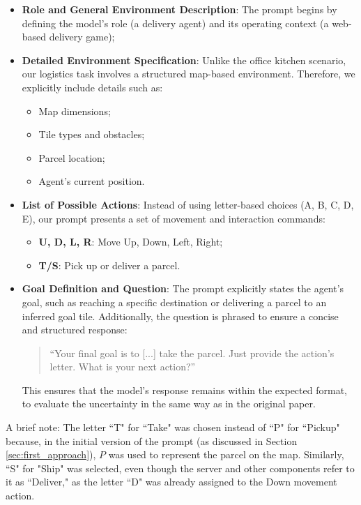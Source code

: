\begin{itemize}
  \item \textbf{Role and General Environment Description}: The prompt begins by defining
    the model's role (a delivery agent) and its operating context (a web-based
    delivery game);

  \item \textbf{Detailed Environment Specification}: Unlike the office kitchen scenario,
    our logistics task involves a structured map-based environment. Therefore,
    we explicitly include details such as:
    \begin{itemize}
      \item Map dimensions;

      \item Tile types and obstacles;

      \item Parcel location;

      \item Agent's current position.
    \end{itemize}

  \item \textbf{List of Possible Actions}: Instead of using letter-based choices
    (A, B, C, D, E), our prompt presents a set of movement and interaction
    commands:
    \begin{itemize}
      \item \textbf{U, D, L, R}: Move Up, Down, Left, Right;

      \item \textbf{T/S}: Pick up or deliver a parcel.
    \end{itemize}

  \item \textbf{Goal Definition and Question}: The prompt explicitly states the agent's
    goal, such as reaching a specific destination or delivering a parcel to an
    inferred goal tile. Additionally, the question is phrased to ensure a
    concise and structured response:
    \begin{quote}
      ``Your final goal is to [...] take the parcel. Just provide the action's
      letter. What is your next action?''
    \end{quote}
    This ensures that the model's response remains within the expected format,
    to evaluate the uncertainty in the same way as in the original paper.
\end{itemize}

A brief note: The letter ``T" for ``Take" was chosen instead of ``P" for ``Pickup"
because, in the initial version of the prompt (as discussed in Section \ref{sec:first_approach}),
$P$ was used to represent the parcel on the map. Similarly, ``S" for "Ship" was
selected, even though the server and other components refer to it as ``Deliver,"
as the letter ``D" was already assigned to the Down movement action.

